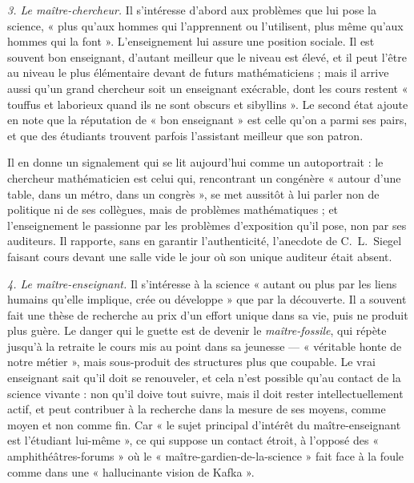 \documentclass[11pt,a4paper]{article}
\begin{document}
\emph{3. Le maître-chercheur.} Il s'intéresse d'abord aux problèmes que lui
pose la science, « plus qu'aux hommes qui l'apprennent ou l'utilisent, plus
même qu'aux hommes qui la font ». L'enseignement lui assure une position
sociale. Il est souvent bon enseignant, d'autant meilleur que le niveau est
élevé, et il peut l'être au niveau le plus élémentaire devant de futurs
mathématiciens ; mais il arrive aussi qu'un grand chercheur soit un
enseignant exécrable, dont les cours restent « touffus et laborieux quand ils
ne sont obscurs et sibyllins ». Le second état ajoute en note que la
réputation de « bon enseignant » est celle qu'on a parmi ses pairs, et que
des étudiants trouvent parfois l'assistant meilleur que son patron.

Il en donne un signalement qui se lit aujourd'hui comme un autoportrait : le
chercheur mathématicien est celui qui, rencontrant un congénère « autour
d'une table, dans un métro, dans un congrès », se met aussitôt à lui parler
non de politique ni de ses collègues, mais de problèmes mathématiques ; et
l'enseignement le passionne par les problèmes d'exposition qu'il pose, non par
ses auditeurs. Il rapporte, sans en garantir l'authenticité, l'anecdote de
C.~L.~Siegel faisant cours devant une salle vide le jour où son unique
auditeur était absent.

\emph{4. Le maître-enseignant.} Il s'intéresse à la science « autant ou plus
par les liens humains qu'elle implique, crée ou développe » que par la
découverte. Il a souvent fait une thèse de recherche au prix d'un effort
unique dans sa vie, puis ne produit plus guère. Le danger qui le guette est de
devenir le \emph{maître-fossile}, qui répète jusqu'à la retraite le cours mis
au point dans sa jeunesse — « véritable honte de notre métier », mais
sous-produit des structures plus que coupable. Le vrai enseignant sait qu'il
doit se renouveler, et cela n'est possible qu'au contact de la science
vivante : non qu'il doive tout suivre, mais il doit rester intellectuellement
actif, et peut contribuer à la recherche dans la mesure de ses moyens, comme
moyen et non comme fin. Car « le sujet principal d'intérêt du
maître-enseignant est l'étudiant lui-même », ce qui suppose un contact
étroit, à l'opposé des « amphithéâtres-forums » où le
« maître-gardien-de-la-science » fait face à la foule comme dans une
« hallucinante vision de Kafka ».
\end{document}
